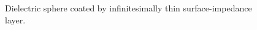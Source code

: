 \documentclass{article}
\begin{document}
\begin{figure}[h]
\caption{Dielectric sphere coated by infinitesimally thin 
surface-impedance layer.}
\label{IBCSphereFigure}
\end{figure}
\end{document}
